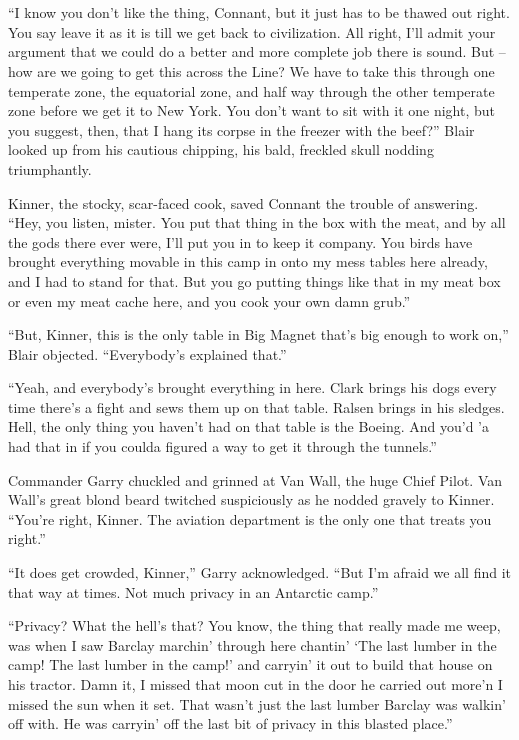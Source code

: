 \documentclass[ebook,oneside,11pt]{memoir}				%
\begin{document}
\chapter[Chapter 3]{}
\lettrine[lines=3,findent=3pt,nindent=2pt]{``I}{} know you don't like the thing, Connant, but it just has to be thawed out right. You say leave it as it is till we get back to civilization. All right, I'll admit your argument that we could do a better and more complete job there is sound. But -- how are we going to get this across the Line? We have to take this through one temperate zone, the equatorial zone, and half way through the other temperate zone before we get it to New York. You don't want to sit with it one night, but you suggest, then, that I hang its corpse in the freezer with the beef?'' Blair looked up from his cautious chipping, his bald, freckled skull nodding triumphantly.

Kinner, the stocky, scar-faced cook, saved Connant the trouble of answering. ``Hey, you listen, mister. You put that thing in the box with the meat, and by all the gods there ever were, I'll put you in to keep it company. You birds have brought everything movable in this camp in onto my mess tables here already, and I had to stand for that. But you go putting things like that in my meat box or even my meat cache here, and you cook your own damn grub.''

``But, Kinner, this is the only table in Big Magnet that's big enough to work on,'' Blair objected. ``Everybody's explained that.''

``Yeah, and everybody's brought everything in here. Clark brings his dogs every time there's a fight and sews them up on that table. Ralsen brings in his sledges. Hell, the only thing you haven't had on that table is the Boeing. And you'd 'a had that in if you coulda figured a way to get it through the tunnels.''

Commander Garry chuckled and grinned at Van Wall, the huge Chief Pilot. Van Wall's great blond beard twitched suspiciously as he nodded gravely to Kinner. ``You're right, Kinner. The aviation department is the only one that treats you right.''

``It does get crowded, Kinner,'' Garry acknowledged. ``But I'm afraid we all find it that way at times. Not much privacy in an Antarctic camp.''

``Privacy? What the hell's that? You know, the thing that really made me weep, was when I saw Barclay marchin' through here chantin' `The last lumber in the camp! The last lumber in the camp!' and carryin' it out to build that house on his tractor. Damn it, I missed that moon cut in the door he carried out more'n I missed the sun when it set. That wasn't just the last lumber Barclay was walkin' off with. He was carryin' off the last bit of privacy in this blasted place.''
\end{document}
